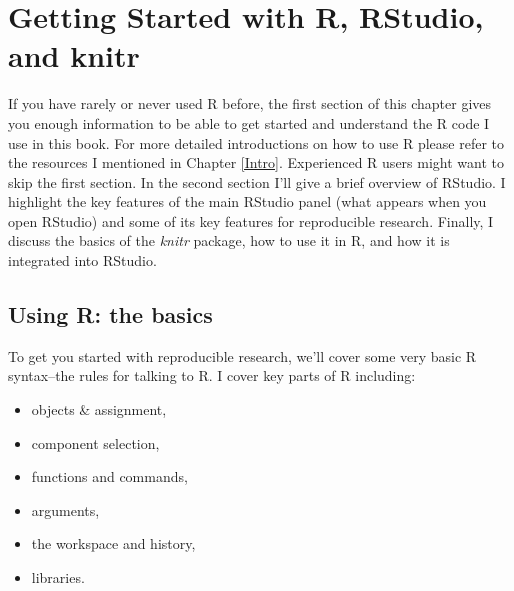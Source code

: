 



\chapter{Getting Started with R, RStudio, and knitr}\label{GettingStartedRKnitr}

If you have rarely or never used R before, the first section of this chapter gives you enough information to be able to get started and understand the R code I use in this book. For more detailed introductions on how to use R please refer to the resources I mentioned in Chapter \ref{Intro}. Experienced R users might want to skip the first section. In the second section I'll give a brief overview of RStudio. I highlight the key features of the main RStudio panel (what appears when you open RStudio) and some of its key features for reproducible research. Finally, I discuss the basics of the {\emph{knitr}} package, how to use it in R, and how it is integrated into RStudio.

\section{Using R: the basics}

To get you started with reproducible research, we'll cover some very basic R syntax--the rules for talking to R. I cover key parts of R including:

\begin{itemize}
    \item objects \& assignment,
    \item component selection,
    \item functions and commands,
    \item arguments,
    \item the workspace and history,
    \item libraries.
\end{itemize}


